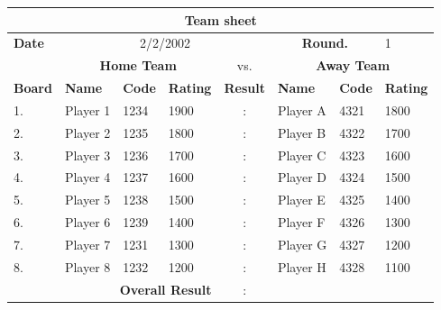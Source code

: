 \documentclass[12pt]{article}
\begin{document}
\begin{tabular}{|l|l|l|l|l|l|l|l|}
\hline
\multicolumn{8}{|c|}{\textbf{Team sheet}} \\
\hline
\hline
\textbf{ Date} & \multicolumn{4}{|c|}{2/2/2002}   & \multicolumn{2}{|c|}{\textbf{Round.}} & 1 \\

\hline
\hline
 & \multicolumn{3}{|c|}{\textbf{Home Team}} &  \multicolumn{1}{|c|}{vs.} & \multicolumn{3}{|c|}{\textbf{Away Team}} \\
\hline
\textbf{Board} & \textbf{Name} & \textbf{Code} & \textbf{Rating} & \textbf{Result} & \textbf{Name} & \textbf{Code} & \textbf{Rating} \\ 
\hline
\hline
1. & Player 1 & 1234 & 1900 &  \multicolumn{1}{|c|}{:}    & Player A & 4321 & 1800\\ 
\hline
2. & Player 2 & 1235 & 1800 &  \multicolumn{1}{|c|}{:}    & Player B & 4322 & 1700\\ 
\hline
3. & Player 3 & 1236 & 1700 &  \multicolumn{1}{|c|}{:}    & Player C & 4323 & 1600\\ 
\hline
4. & Player 4 & 1237 & 1600 &  \multicolumn{1}{|c|}{:}    & Player D & 4324 & 1500\\ 
\hline
5. & Player 5 & 1238 & 1500 &  \multicolumn{1}{|c|}{:}    & Player E & 4325 & 1400\\ 
\hline
6. & Player 6 & 1239 & 1400 &  \multicolumn{1}{|c|}{:}    & Player F & 4326 & 1300\\ 
\hline
7. & Player 7 & 1231 & 1300 &  \multicolumn{1}{|c|}{:}    & Player G & 4327 & 1200\\ 
\hline
8. & Player 8 & 1232 & 1200 &  \multicolumn{1}{|c|}{:}    & Player H & 4328 & 1100\\ 
\hline
\hline
\multicolumn{4}{|r|}{\textbf{Overall Result}} & \multicolumn{1}{|c|}{:}  & \multicolumn{3}{|c|}{} \\
\hline
\end{tabular}
\end{document}
